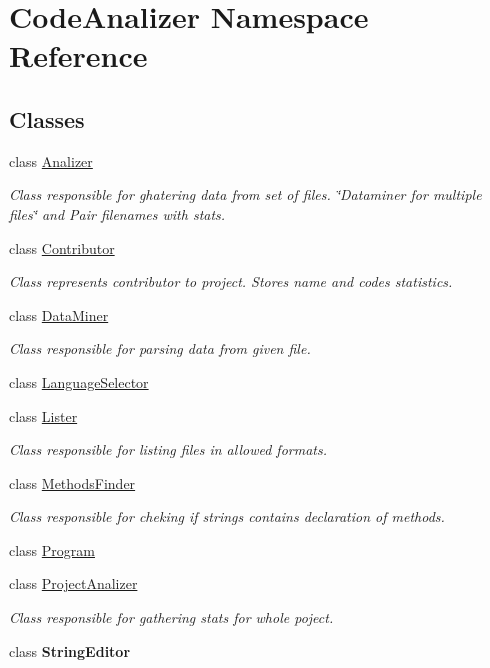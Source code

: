 \hypertarget{namespace_code_analizer}{}\section{Code\+Analizer Namespace Reference}
\label{namespace_code_analizer}
\subsection*{Classes}
\begin{DoxyCompactItemize}
\item 
class \mbox{\hyperlink{class_code_analizer_1_1_analizer}{Analizer}}
\begin{DoxyCompactList}\small\item\em Class responsible for ghatering data from set of files. \char`\"{}\+Dataminer for multiple files\char`\"{} and Pair filenames with stats. \end{DoxyCompactList}\item 
class \mbox{\hyperlink{class_code_analizer_1_1_contributor}{Contributor}}
\begin{DoxyCompactList}\small\item\em Class represents contributor to project. Stores name and codes statistics. \end{DoxyCompactList}\item 
class \mbox{\hyperlink{class_code_analizer_1_1_data_miner}{Data\+Miner}}
\begin{DoxyCompactList}\small\item\em Class responsible for parsing data from given file. \end{DoxyCompactList}\item 
class \mbox{\hyperlink{class_code_analizer_1_1_language_selector}{Language\+Selector}}
\item 
class \mbox{\hyperlink{class_code_analizer_1_1_lister}{Lister}}
\begin{DoxyCompactList}\small\item\em Class responsible for listing files in allowed formats. \end{DoxyCompactList}\item 
class \mbox{\hyperlink{class_code_analizer_1_1_methods_finder}{Methods\+Finder}}
\begin{DoxyCompactList}\small\item\em Class responsible for cheking if strings contains declaration of methods. \end{DoxyCompactList}\item 
class \mbox{\hyperlink{class_code_analizer_1_1_program}{Program}}
\item 
class \mbox{\hyperlink{class_code_analizer_1_1_project_analizer}{Project\+Analizer}}
\begin{DoxyCompactList}\small\item\em Class responsible for gathering stats for whole poject. \end{DoxyCompactList}\item 
class {\bfseries String\+Editor}
\end{DoxyCompactItemize}
